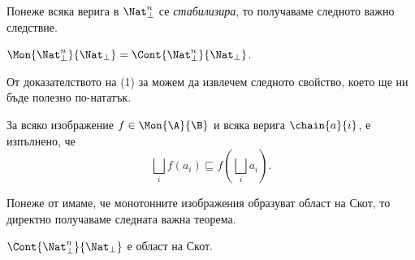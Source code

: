 Понеже всяка верига в $\Nat^n_\bot$ се {\em стабилизира}, то
получаваме следното важно следствие.
\begin{framed}
\begin{cor}
  \label{cr:monotone-is-continuous}
  $\Mon{\Nat^n_\bot}{\Nat_\bot} = \Cont{\Nat^n_\bot}{\Nat_\bot}$.
\end{cor}  
\end{framed}

От доказателството на (1) за  можем да извлечем следното свойство,
което ще ни бъде полезно по-нататък.
\begin{prop}
  \label{pr:monotone-chain}
  За всяко изображение $f \in \Mon{\A}{\B}$ и всяка верига $\chain{a}{i}$, е изпълнено, че
  \[\bigsqcup_i f(a_i) \sqsubseteq f(\bigsqcup_i a_i).\]
\end{prop}

Понеже от  имаме, че монотонните изображения образуват област на Скот, 
то директно получаваме следната важна теорема.

\begin{framed}
\begin{theorem}
  \label{th:continuous-is-domain}
  $\Cont{\Nat^n_\bot}{\Nat_\bot}$ е област на Скот.
\end{theorem}
\end{framed}



